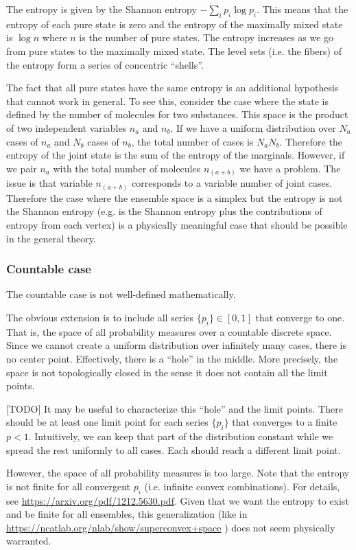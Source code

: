 The entropy is given by the Shannon entropy $-\sum_i p_i \log p_i$. This means that the entropy of each pure state is zero and the entropy of the maximally mixed state is $\log n$ where $n$ is the number of pure states. The entropy increases as we go from pure states to the maximally mixed state. The level sets (i.e. the fibers) of the entropy form a series of concentric ``shells''.

The fact that all pure states have the same entropy is an additional hypothesis that cannot work in general. To see this, consider the case where the state is defined by the number of molecules for two substances. This space is the product of two independent variables $n_a$ and $n_b$. If we have a uniform distribution over $N_a$ cases of $n_a$ and $N_b$ cases of $n_b$, the total number of cases is $N_a N_b$. Therefore the entropy of the joint state is the sum of the entropy of the marginals. However, if we pair $n_a$ with the total number of molecules $n_{(a+b)}$ we have a problem. The issue is that variable $n_{(a+b)}$ corresponds to a variable number of joint cases. Therefore the case where the ensemble space is a simplex but the entropy is not the Shannon entropy (e.g. is the Shannon entropy plus the contributions of entropy from each vertex) is a physically meaningful case that should be possible in the general theory.

\subsubsection{Countable case}

The countable case is not well-defined mathematically.

The obvious extension is to include all series $\{p_i\} \in [0,1]$ that converge to one. That is, the space of all probability measures over a countable discrete space. Since we cannot create a uniform distribution over infinitely many cases, there is no center point. Effectively, there is a ``hole'' in the middle. More precisely, the space is not topologically closed in the sense it does not contain all the limit points.

[TODO] It may be useful to characterize this ``hole'' and the limit points. There should be at least one limit point for each series $\{p_i\}$ that converges to a finite $p < 1$. Intuitively, we can keep that part of the distribution constant while we spread the rest uniformly to all cases. Each should reach a different limit point.

However, the space of all probability measures is too large. Note that the entropy is not finite for all convergent $p_i$ (i.e. infinite convex combinations). For details, see \url{https://arxiv.org/pdf/1212.5630.pdf}. Given that we want the entropy to exist and be finite for all ensembles, this generalization (like in \url{https://ncatlab.org/nlab/show/superconvex+space} ) does not seem physically warranted.


